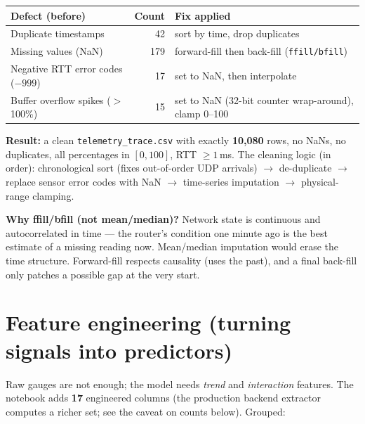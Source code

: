 \documentclass[11pt,a4paper]{article}
\newcommand{\note}[1]{%
  \par\vspace{3pt}\noindent
  \colorbox{soft}{\parbox{\dimexpr\linewidth-2\fboxsep}{\small #1}}%
  \par\vspace{3pt}}
\begin{document}
\begin{center}
\begin{tabularx}{\linewidth}{@{}Xrp{6.4cm}@{}}
\toprule
\textbf{Defect (before)} & \textbf{Count} & \textbf{Fix applied} \\
\midrule
Duplicate timestamps & 42 & sort by time, drop duplicates \\
Missing values (NaN) & 179 & forward-fill then back-fill (\texttt{ffill/bfill}) \\
Negative RTT error codes ($-999$) & 17 & set to NaN, then interpolate \\
Buffer overflow spikes ($>$100\%) & 15 & set to NaN (32-bit counter wrap-around), clamp 0--100 \\
\bottomrule
\end{tabularx}
\end{center}

\textbf{Result:} a clean \texttt{telemetry\_trace.csv} with exactly \textbf{10{,}080} rows, no NaNs, no
duplicates, all percentages in $[0,100]$, RTT $\geq 1$\,ms. The cleaning logic (in order): chronological sort
(fixes out-of-order UDP arrivals) $\rightarrow$ de-duplicate $\rightarrow$ replace sensor error codes with NaN
$\rightarrow$ time-series imputation $\rightarrow$ physical-range clamping.

\note{\textbf{Why ffill/bfill (not mean/median)?} Network state is continuous and autocorrelated in time ---
the router's condition one minute ago is the best estimate of a missing reading now. Mean/median imputation
would erase the time structure. Forward-fill respects causality (uses the past), and a final back-fill only
patches a possible gap at the very start.}

\section{Feature engineering (turning signals into predictors)}
Raw gauges are not enough; the model needs \emph{trend} and \emph{interaction} features. The notebook adds
\textbf{17} engineered columns (the production backend extractor computes a richer set; see the caveat on
counts below). Grouped:
\end{document}
